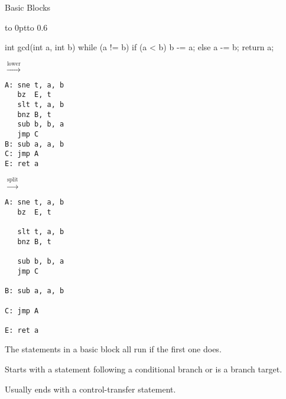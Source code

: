 \documentclass{plt}
\begin{document}
\begin{frame}[fragile]{Basic Blocks}

\vbox to 0pt{\vss\hbox to 0.6\vskip 1pc\vss}

\begin{minipage}{0.3\textwidth}
\begin{C}
int gcd(int a, int b) {
  while (a != b) {
    if (a < b) b -= a;
    else a -= b;
  }
  return a;
}
\end{C}

\end{minipage}
%
$\stackrel{\textrm{lower}}{\rightarrow}$
%
\begin{minipage}{0.25\textwidth}
\fontsize{8}{8}\selectfont
\begin{verbatim}
A: sne t, a, b
   bz  E, t
   slt t, a, b
   bnz B, t
   sub b, b, a
   jmp C
B: sub a, a, b
C: jmp A
E: ret a
\end{verbatim}
\end{minipage}
%
$\stackrel{\textrm{split}}{\rightarrow}$
%
\begin{minipage}{0.25\textwidth}
\fontsize{8}{8}\selectfont
\begin{verbatim}
A: sne t, a, b
   bz  E, t

   slt t, a, b
   bnz B, t

   sub b, b, a
   jmp C

B: sub a, a, b

C: jmp A

E: ret a
\end{verbatim}
\end{minipage}

The statements in a basic block all run if the first one does.

Starts with a statement following a conditional branch or is a branch target.

Usually ends with a control-transfer statement.

\end{frame}
\end{document}
